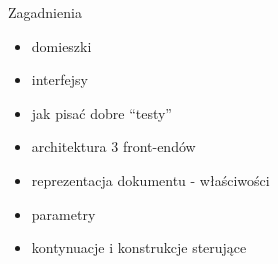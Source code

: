 \documentclass{beamer}
\begin{document}
\begin{frame}{Zagadnienia}
  \begin{itemize}\pause
  \item domieszki\pause
  \item interfejsy\pause
  \item jak pisać dobre ``testy''\pause
  \item architektura 3 front-endów\pause
  \item reprezentacja dokumentu - właściwości\pause
  \item parametry\pause
  \item kontynuacje i konstrukcje sterujące
  \end{itemize}
\end{frame}
\end{document}

